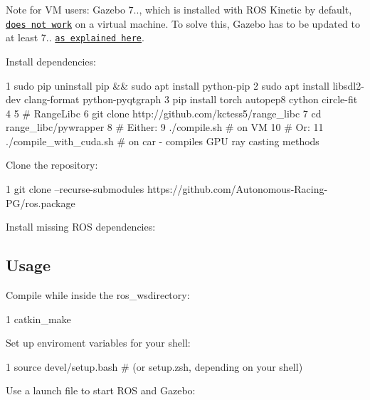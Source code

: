 Note for VM users\+: Gazebo 7.., which is installed with R\+OS Kinetic by default, \href{https://bitbucket.org/osrf/gazebo/issues/1837/vmware-rendering-z-ordering-appears-random}{\tt does not work} on a virtual machine. To solve this, Gazebo has to be updated to at least 7.. \href{http://gazebosim.org/tutorials?cat=install&tut=install_ubuntu&ver=7.0#Alternativeinstallation:step-by-step}{\tt as explained here}.

Install dependencies\+:


\begin{DoxyCode}
1 sudo pip uninstall pip && sudo apt install python-pip
2 sudo apt install libsdl2-dev clang-format python-pyqtgraph
3 pip install torch autopep8 cython circle-fit
4 
5 # RangeLibc
6 git clone http://github.com/kctess5/range\_libc
7 cd range\_libc/pywrapper
8 # Either:
9 ./compile.sh            # on VM
10 # Or:
11 ./compile\_with\_cuda.sh  # on car - compiles GPU ray casting methods
\end{DoxyCode}


Clone the repository\+:


\begin{DoxyCode}
1 git clone --recurse-submodules https://github.com/Autonomous-Racing-PG/ros.package
\end{DoxyCode}


Install missing R\+OS dependencies\+:




\subsection*{Usage}

Compile while inside the {\ttfamily ros\+\_\+ws}directory\+:


\begin{DoxyCode}
1 catkin\_make
\end{DoxyCode}


Set up enviroment variables for your shell\+:


\begin{DoxyCode}
1 source devel/setup.bash # (or setup.zsh, depending on your shell)
\end{DoxyCode}


Use a launch file to start R\+OS and Gazebo\+:


